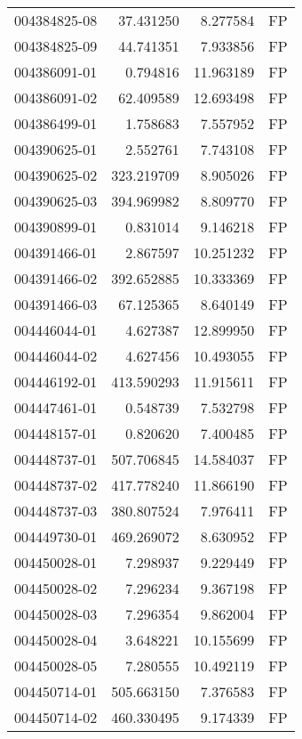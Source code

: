 \begin{tabular}{lrrl}
004384825-08 &   37.431250 &       8.277584 &   FP \\
004384825-09 &   44.741351 &       7.933856 &   FP \\
004386091-01 &    0.794816 &      11.963189 &   FP \\
004386091-02 &   62.409589 &      12.693498 &   FP \\
004386499-01 &    1.758683 &       7.557952 &   FP \\
004390625-01 &    2.552761 &       7.743108 &   FP \\
004390625-02 &  323.219709 &       8.905026 &   FP \\
004390625-03 &  394.969982 &       8.809770 &   FP \\
004390899-01 &    0.831014 &       9.146218 &   FP \\
004391466-01 &    2.867597 &      10.251232 &   FP \\
004391466-02 &  392.652885 &      10.333369 &   FP \\
004391466-03 &   67.125365 &       8.640149 &   FP \\
004446044-01 &    4.627387 &      12.899950 &   FP \\
004446044-02 &    4.627456 &      10.493055 &   FP \\
004446192-01 &  413.590293 &      11.915611 &   FP \\
004447461-01 &    0.548739 &       7.532798 &   FP \\
004448157-01 &    0.820620 &       7.400485 &   FP \\
004448737-01 &  507.706845 &      14.584037 &   FP \\
004448737-02 &  417.778240 &      11.866190 &   FP \\
004448737-03 &  380.807524 &       7.976411 &   FP \\
004449730-01 &  469.269072 &       8.630952 &   FP \\
004450028-01 &    7.298937 &       9.229449 &   FP \\
004450028-02 &    7.296234 &       9.367198 &   FP \\
004450028-03 &    7.296354 &       9.862004 &   FP \\
004450028-04 &    3.648221 &      10.155699 &   FP \\
004450028-05 &    7.280555 &      10.492119 &   FP \\
004450714-01 &  505.663150 &       7.376583 &   FP \\
004450714-02 &  460.330495 &       9.174339 &   FP \\

\end{tabular}
